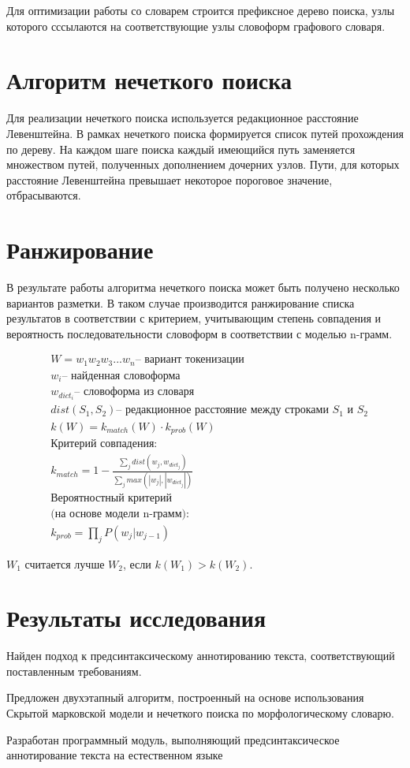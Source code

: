 \documentclass[14pt]{extarticle}
\begin{document}
Для оптимизации работы со словарем строится префиксное дерево поиска, узлы которого сссылаются на соответствующие узлы словоформ графового словаря.


\section{Алгоритм нечеткого поиска}
Для реализации нечеткого поиска используется редакционное расстояние Левенштейна.
В рамках нечеткого поиска формируется список путей прохождения по дереву. На каждом шаге поиска каждый имеющийся путь заменяется множеством путей, полученных дополнением дочерних узлов. Пути, для которых расстояние Левенштейна превышает некоторое пороговое значение, отбрасываются.

\section{Ранжирование}
В результате работы алгоритма нечеткого поиска может быть получено несколько вариантов разметки. В таком случае производится ранжирование списка результатов в соответствии с критерием, учитывающим степень совпадения и вероятность последовательности словоформ в соответствии с моделью n-грамм.

\begin{align*}
	&W = w_1w_2w_3...w_n  \text{-- вариант токенизации} \\
	&w_i \text{-- найденная словоформа} \\
	&w_{dict_i} \text{-- словоформа из словаря} \\
	&dist(S_1, S_2) \text{-- редакционное расстояние между строками } S_1 \text{ и } S_2\\
	&k(W) = k_{match}(W) \cdot k_{prob}(W) \\
	&\text{Критерий совпадения:} \\
	&k_{match} = 1 - \frac{\displaystyle\sum_{j} dist(w_j,w_{dict_j}) }{\displaystyle\sum_{j} max(|w_j|,|w_{dict_j}|) } \\
	&\text{Вероятностный критерий} \\
	&\text{(на основе модели n-грамм): } \\
	&k_{prob} = \prod_{j}P(w_j|w_{j-1})
\end{align*}



\(W_1\) считается лучше \(W_2\), если \(k(W_1) > k(W_2)\).


\section{Результаты исследования}

Найден подход к предсинтаксическому аннотированию текста, соответствующий поставленным требованиям.

Предложен двухэтапный алгоритм, построенный на основе использования Скрытой марковской модели и нечеткого поиска по морфологическому словарю.

Разработан программный модуль, выполняющий предсинтаксическое аннотирование текста на естественном языке
\end{document}

